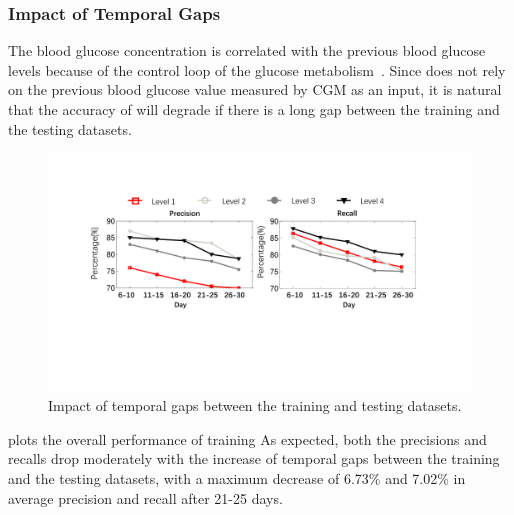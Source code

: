 \subsubsection{Impact of Temporal Gaps}
\label{subsubsec:gaps}

The blood glucose concentration is correlated with the previous blood glucose levels because of the control loop of the glucose metabolism~\cite{bib:TBE07:Dalla, bib:PE04:Hovorka, bib:IJNMBE16:Oviedo}.
Since \sysname does not rely on the previous blood glucose value measured by CGM as an input, it is natural that the accuracy of \sysname will degrade if there is a long gap between the training and the testing datasets.
\begin{figure}[h]
  \centering
  \includegraphics[width=0.8\columnwidth]{./img/Performance_gap2.pdf}
  \caption{Impact of temporal gaps between the training and testing datasets.}
  \label{fig:per_under_various_pred_days}
\end{figure}

 plots the overall performance of training 
As expected, both the precisions and recalls drop moderately with the increase of temporal gaps between the training and the testing datasets, with a maximum decrease of 6.73\% and 7.02\% in average precision and recall after 21-25 days.

